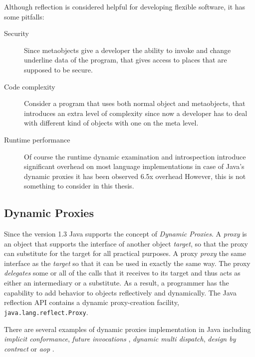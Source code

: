 Although reflection is considered helpful for developing flexible software, it has some pitfalls:

\begin{description}
	
	\item[Security] Since metaobjects give a developer the ability to invoke and change underline data of the program, that gives access to places that are supposed to be secure.

	\item[Code complexity] Consider a program that uses both normal object and metaobjects, that introduces an extra level of complexity since now a developer has to deal with different kind of objects with one on the meta level.

	\item[Runtime performance] Of course the runtime dynamic examination and introspection introduce significant overhead on most language implementations in case of Java's dynamic proxies it has been observed 6.5x overhead \cite{marr2015zero} However, this is not something to consider in this thesis.

\end{description}

\subsection{Dynamic Proxies}\label{Dynamic Proxies}
Since the version 1.3 Java supports the concept of \textit{Dynamic Proxies}.
A \textit{proxy} is an object that supports the interface of another object \textit{target}, so that the proxy can substitute for the target for all practical purposes\cite{forman2004java}.
A proxy \textit{proxy} the same interface as the \textit{target} so that it can be used in exactly the same way. 
The proxy \textit{delegates} some or all of the calls that it receives to its target and thus acts as either an intermediary or a substitute.
As a result, a programmer has the capability to add behavior to objects reflectively and dynamically. The Java reflection API contains a dynamic proxy-creation facility, \texttt{java.lang.reflect.Proxy}.

There are several examples of dynamic proxies implementation in Java including \textit{implicit conformance}, \textit{future invocations} \cite{pratikakis2004transparent}, \textit{dynamic multi dispatch}, \textit{design by contract} or \textit{\ac{aop}} \cite{eugster2006uniform}.

